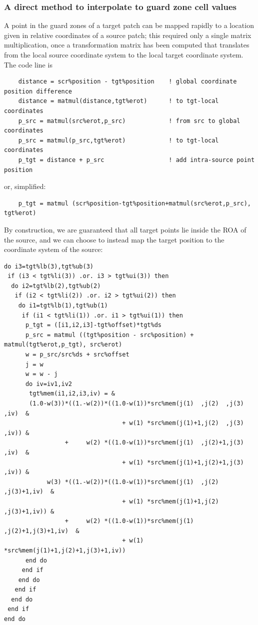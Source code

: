 \documentclass[paper=a4,fontsize=11pt]{scrartcl}
\numberwithin{equation}{section}		%
\numberwithin{figure}{section}			%
\numberwithin{table}{section}				%
\newcommand{\codecolor}{\color{Blue}}
\begin{document}
\subsubsection{A direct method to interpolate to guard zone cell values}
A point in the guard zones of a target patch can be mapped rapidly to a location given in relative coordinates of a source patch; this required only a single matrix multiplication, once a transformation matrix has been computed that translates from the local source coordinate system to the local target coordinate system.  The code line is
{\small\codecolor\begin{verbatim}
    distance = scr%position - tgt%position    ! global coordinate position difference
    distance = matmul(distance,tgt%erot)      ! to tgt-local coordinates
    p_src = matmul(src%erot,p_src)            ! from src to global coordinates
    p_src = matmul(p_src,tgt%erot)            ! to tgt-local coordinates
    p_tgt = distance + p_src                  ! add intra-source point position
\end{verbatim}}
or, simplified:
{\small\codecolor\begin{verbatim}
    p_tgt = matmul (scr%position-tgt%position+matmul(src%erot,p_src), tgt%erot)
\end{verbatim}}
By construction, we are guaranteed that all target points lie inside the ROA of the source, and we can choose to instead map the target position to the coordinate system of the source:
{\footnotesize\codecolor\begin{verbatim}
do i3=tgt%lb(3),tgt%ub(3)
 if (i3 < tgt%li(3)) .or. i3 > tgt%ui(3)) then
  do i2=tgt%lb(2),tgt%ub(2)
   if (i2 < tgt%li(2)) .or. i2 > tgt%ui(2)) then
    do i1=tgt%lb(1),tgt%ub(1)
     if (i1 < tgt%li(1)) .or. i1 > tgt%ui(1)) then
      p_tgt = ([i1,i2,i3]-tgt%offset)*tgt%ds
      p_src = matmul ((tgt%position - src%position) + matmul(tgt%erot,p_tgt), src%erot)
      w = p_src/src%ds + src%offset
      j = w
      w = w - j
      do iv=iv1,iv2
       tgt%mem(i1,i2,i3,iv) = &
       (1.0-w(3))*((1.-w(2))*((1.0-w(1))*src%mem(j(1)  ,j(2)  ,j(3)  ,iv)  &
                                 + w(1) *src%mem(j(1)+1,j(2)  ,j(3)  ,iv)) &
                 +     w(2) *((1.0-w(1))*src%mem(j(1)  ,j(2)+1,j(3)  ,iv)  &
                                 + w(1) *src%mem(j(1)+1,j(2)+1,j(3)  ,iv)) &
            w(3) *((1.-w(2))*((1.0-w(1))*src%mem(j(1)  ,j(2)  ,j(3)+1,iv)  &
                                 + w(1) *src%mem(j(1)+1,j(2)  ,j(3)+1,iv)) &
                 +     w(2) *((1.0-w(1))*src%mem(j(1)  ,j(2)+1,j(3)+1,iv)  &
                                 + w(1) *src%mem(j(1)+1,j(2)+1,j(3)+1,iv))
      end do
     end if
    end do
   end if
  end do
 end if
end do
\end{verbatim}}
\end{document}

